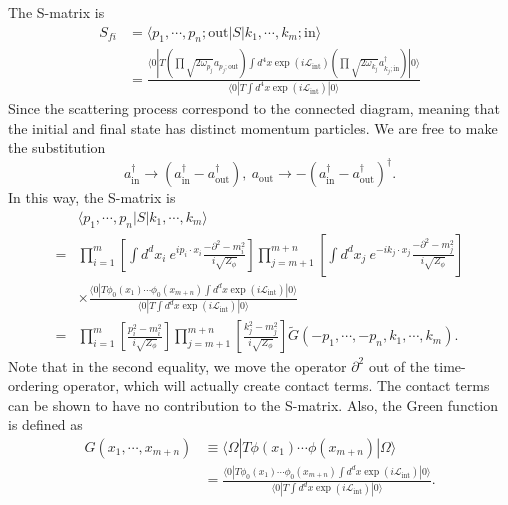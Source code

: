 The S-matrix is
\begin{equation*}
\begin{aligned}
	S_{fi} &= \langle p_1, \cdots, p_n;\mathrm{out}| S |k_1, \cdots, k_m; \mathrm{in}\rangle \\
	&= \frac{\langle 0|T 
		\left(\prod \sqrt{2\omega_{p_j}} a_{p_j;\mathrm{out}} \right)
		\int d^4 x \exp(i\mathcal{L}_{\mathrm{int}})
		\left(\prod \sqrt{2\omega_{k_j}} a^\dagger_{k_j;\mathrm{in}} \right)|0\rangle}
		{\langle 0|T\int d^4 x \exp(i\mathcal{L}_{\mathrm{int}})|0\rangle}
\end{aligned}
\end{equation*}
Since the scattering process correspond to the connected diagram, meaning that the initial and final state has distinct momentum particles.
We are free to make the substitution
\begin{equation*}
	a^\dagger_{\mathrm{in}} \rightarrow (a_{\mathrm{in}}^\dagger - a_{\mathrm{out}}^\dagger),\ 
	a_{\mathrm{out}} \rightarrow -(a_{\mathrm{in}}^\dagger - a_{\mathrm{out}}^\dagger)^\dagger.
\end{equation*}
In this way, the S-matrix is
\begin{equation*}
\begin{aligned}
	& \langle p_1, \cdots, p_n| S |k_1, \cdots, k_m\rangle  \\
	=& \prod_{i=1}^{m}\left[ \int d^dx_i \ e^{ip_i\cdot x_i}\frac{-\partial^2-m_i^2}{i\sqrt{Z_\phi}}\right]
	\prod_{j=m+1}^{m+n}\left[\int d^dx_j \ e^{-ik_j\cdot x_j}\frac{-\partial^2-m_j^2}{i\sqrt{Z_\phi}}\right] \\
	& \times \frac{\langle 0| T \phi_0(x_1)\cdots \phi_0(x_{m+n}) \int d^dx \exp(i\mathcal{L}_{\mathrm{int}})|0\rangle}
		{\langle 0|T\int d^dx \exp(i\mathcal{L}_{\mathrm{int}})|0\rangle} \\
	=& \prod_{i=1}^{m}\left[\frac{p_i^2-m_i^2}{i\sqrt{Z_\phi}}\right]
		\prod_{j=m+1}^{m+n}\left[\frac{k_j^2-m_j^2}{i\sqrt{Z_\phi}}\right]
		\tilde{G}(-p_1,\cdots,-p_n,k_1,\cdots,k_m).
	\label{eq:K-G-LSZ}
\end{aligned}
\end{equation*}
Note that in the second equality, we move the operator $\partial^2$ out of the time-ordering operator, which will actually create contact terms.
The contact terms can be shown to have no contribution to the S-matrix.
Also, the Green function is defined as
\begin{equation*}
\begin{aligned}
	G(x_1,\cdots,x_{m+n}) 
	&\equiv \langle \Omega|T \phi(x_1)\cdots \phi(x_{m+n})|\Omega\rangle \\
	&= \frac{\langle 0| T \phi_0(x_1)\cdots \phi_0(x_{m+n}) \int d^dx \exp(i\mathcal{L}_{\mathrm{int}})|0\rangle}
		{\langle 0|T\int d^dx \exp(i\mathcal{L}_{\mathrm{int}})|0\rangle}.
\end{aligned}
\end{equation*}

